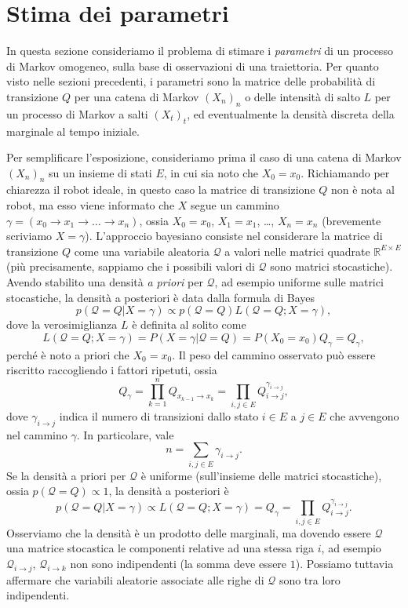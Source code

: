 \documentclass[
  italian,
  letterpaper,
]{book}
\newcommand{\R}{\mathbb{R}}
\theoremstyle{definition}
\theoremstyle{remark}
\begin{document}
\section{Stima dei parametri}\label{sec-mle-markov}

In questa sezione consideriamo il problema di stimare i \emph{parametri}
di un processo di Markov omogeneo, sulla base di osservazioni di una
traiettoria. Per quanto visto nelle sezioni precedenti, i parametri sono
la matrice delle probabilità di transizione \(Q\) per una catena di
Markov \((X_n)_{n}\) o delle intensità di salto \(L\) per un processo di
Markov a salti \((X_t)_t\), ed eventualmente la densità discreta della
marginale al tempo iniziale.

Per semplificare l'esposizione, consideriamo prima il caso di una catena
di Markov \((X_n)_n\) su un insieme di stati \(E\), in cui sia noto che
\(X_0 = x_0\). Richiamando per chiarezza il robot ideale, in questo caso
la matrice di transizione \(Q\) non è nota al robot, ma esso viene
informato che \(X\) segue un cammino
\(\gamma = (x_0 \to x_1 \to \ldots \to x_n)\), ossia \(X_0 = x_0\),
\(X_1=x_1\), \ldots, \(X_n = x_n\) (brevemente scriviamo
\(X = \gamma\)). L'approccio bayesiano consiste nel considerare la
matrice di transizione \(Q\) come una variabile aleatoria
\(\mathcal{Q}\) a valori nelle matrici quadrate \(\R^{E \times E}\) (più
precisamente, sappiamo che i possibili valori di \(\mathcal{Q}\) sono
matrici stocastiche). Avendo stabilito una densità \emph{a priori} per
\(\mathcal{Q}\), ad esempio uniforme sulle matrici stocastiche, la
densità a posteriori è data dalla formula di Bayes
\[  p( \mathcal{Q} = Q | X = \gamma) \propto p(\mathcal{Q} =Q )  L( \mathcal{Q} =Q ; X = \gamma),\]
dove la verosimiglianza \(L\) è definita al solito come
\[ L( \mathcal{Q} =Q ; X = \gamma) = P(X=\gamma| \mathcal{Q} = Q) = P(X_0 = x_0) Q_\gamma = Q_{\gamma},\]
perché è noto a priori che \(X_0 = x_0\). Il peso del cammino osservato
può essere riscritto raccogliendo i fattori ripetuti, ossia
\[ Q_\gamma = \prod_{k=1}^n Q_{x_{k-1} \to x_{k}} = \prod_{i,j \in E} Q_{i\to j}^{\gamma_{i\to j}},\]
dove \(\gamma_{i\to j}\) indica il numero di transizioni dallo stato
\(i\in E\) a \(j \in E\) che avvengono nel cammino \(\gamma\). In
particolare, vale \[ n = \sum_{i,j \in E} \gamma_{i\to j}.\] Se la
densità a priori per \(\mathcal{Q}\) è uniforme (sull'insieme delle
matrici stocastiche), ossia \(p(\mathcal{Q} = Q) \propto 1\), la densità
a posteriori è
\[ p(\mathcal{Q} = Q| X = \gamma) \propto L(\mathcal{Q} = Q; X=\gamma) = Q_\gamma = \prod_{i,j \in E} Q_{i\to j}^{\gamma_{i\to j}}.\]
Osserviamo che la densità è un prodotto delle marginali, ma dovendo
essere \(\mathcal{Q}\) una matrice stocastica le componenti relative ad
una stessa riga \(i\), ad esempio \(\mathcal{Q}_{i \to j}\),
\(\mathcal{Q}_{i \to k}\) non sono indipendenti (la somma deve essere
\(1\)). Possiamo tuttavia affermare che variabili aleatorie associate
alle righe di \(\mathcal{Q}\) sono tra loro indipendenti.
\end{document}
